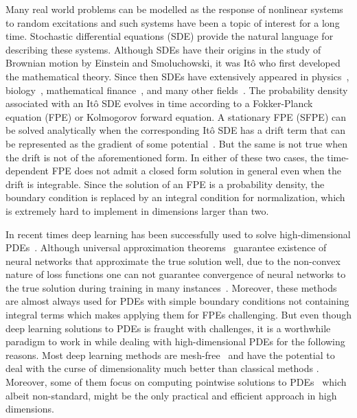 Many real world problems can be modelled as the response of nonlinear systems to random excitations and such systems have been a topic of interest for a long time. Stochastic differential equations (SDE) provide the natural language for describing these systems. Although SDEs have their origins in the study of Brownian motion by Einstein and Smoluchowski, it was Itô who first developed the mathematical theory. Since then SDEs have extensively appeared in physics~\cite{lelievre2016partial, strauss2017hitch, ivanov1980method}, biology~\cite{allen2010introduction}, mathematical finance~\cite{delong2013backward, karoui1997non}, and many other fields~\cite{oksendal2003stochastic, gardiner2009stochastic}. 
The probability density associated with an Itô SDE evolves in time according to a Fokker-Planck equation (FPE) or Kolmogorov forward equation. A stationary FPE (SFPE) can be solved analytically when the corresponding Itô SDE has a drift term that can be represented as the gradient of some potential~\cite{risken1996fokker}. 
But the same is not true when the drift is not of the aforementioned form. In either of these two cases, the time-dependent FPE does not admit a closed form solution in general even when the drift is integrable. Since the solution of an FPE is a probability density, the boundary condition is replaced by an integral condition for normalization, which is extremely hard to implement in dimensions larger than two.

In recent times deep learning has been successfully used to solve high-dimensional PDEs~\cite{sirignano2018dgm, han2018solving, raissi2019physics}. Although universal approximation theorems~\cite{pinkus1999approximation, lu2020universal, de2021approximation, kovachki2021universal, de2022error, mishra2022estimates} guarantee existence of neural networks that approximate the true solution well, due to the non-convex nature of loss functions one can not guarantee convergence of neural networks to the true solution during training in many instances~\cite{krishnapriyan2021characterizing, basir2022investigating}.
Moreover, these methods are almost always used for PDEs with simple boundary conditions not containing integral terms which makes applying them for FPEs challenging. But even though deep learning solutions to PDEs is fraught with challenges, it is a worthwhile paradigm to work in while dealing with high-dimensional PDEs for the following reasons. 
Most deep learning methods are mesh-free~\cite{blechschmidt2021three} and have the potential to deal with the curse of dimensionality much better than classical methods \cite{cioica2022deep}. Moreover, some of them focus on computing pointwise solutions to PDEs~\cite{han2018solving} which albeit non-standard, might be the only practical and efficient approach in high dimensions. 

